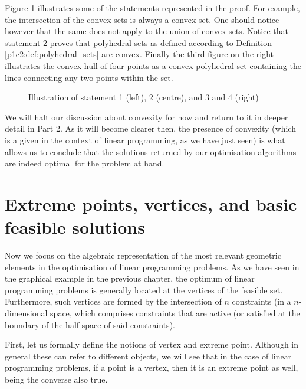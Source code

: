 Figure \ref{p1c2:fig:convexity_theorem_examples} illustrates some of the statements represented in the proof. For example, the intersection of the convex sets is always a convex set. One should notice however that the same does not apply to the union of convex sets. Notice that statement 2 proves that polyhedral sets as defined according to Definition \ref{p1c2:def:polyhedral_sets} are convex. Finally the third figure on the right illustrates the convex hull of four points as a convex polyhedral set containing the lines connecting any two points within the set. 
 
\begin{figure}
    \vspace{-6pt}
	\caption{Illustration of statement 1 (left), 2 (centre), and 3 and 4 (right)} \label{p1c2:fig:convexity_theorem_examples}
\end{figure}	

We will halt our discussion about convexity for now and return to it in deeper detail in Part 2. As it will become clearer then, the presence of convexity (which is a given in the context of linear programming, as we have just seen) is what allows us to conclude that the solutions returned by our optimisation algorithms are indeed optimal for the problem at hand. 


\section{Extreme points, vertices, and basic feasible solutions}

Now we focus on the algebraic representation of the most relevant geometric elements in the optimisation of linear programming problems. As we have seen in the graphical example in the previous chapter, the optimum of linear programming problems is generally located at the vertices of the feasible set. Furthermore, such vertices are formed by the intersection of $n$ constraints (in a $n$-dimensional space, which comprises constraints that are active (or satisfied at the boundary of the half-space of said constraints).

First, let us formally define the notions of vertex and extreme point. Although in general these can refer to different objects, we will see that in the case of linear programming problems, if a point is a vertex, then it is an extreme point as well, being the converse also true.

